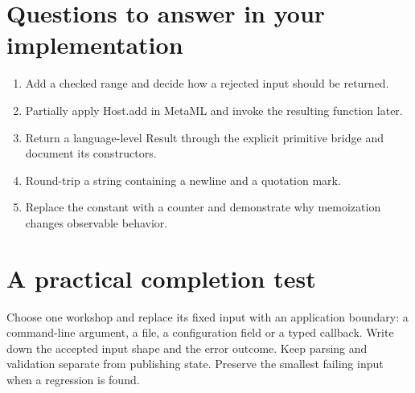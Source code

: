 \section*{Questions to answer in your implementation}
\begin{enumerate}
\item Add a checked range and decide how a rejected input should be returned.
\item Partially apply Host.add in MetaML and invoke the resulting function later.
\item Return a language-level Result through the explicit primitive bridge and document its constructors.
\item Round-trip a string containing a newline and a quotation mark.
\item Replace the constant with a counter and demonstrate why memoization changes observable behavior.
\end{enumerate}
\section*{A practical completion test}
Choose one workshop and replace its fixed input with an application boundary: a command-line argument, a file, a configuration field or a typed callback. Write down the accepted input shape and the error outcome. Keep parsing and validation separate from publishing state. Preserve the smallest failing input when a regression is found.

